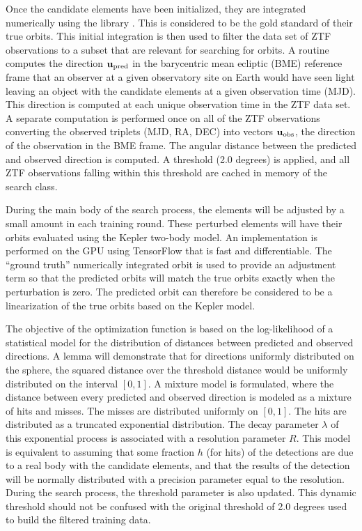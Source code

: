 Once the candidate elements have been initialized, they are integrated numerically using the  library \cite{RL-Rebound}.
This is considered to be the gold standard of their true orbits.
This initial integration is then used to filter the data set of ZTF observations to a subset that are relevant for searching for orbits.
A routine computes the direction $\mathbf{u}_{\mathrm{pred}}$ in the barycentric mean ecliptic (BME) reference frame
that an observer at a given observatory site on Earth would have seen light leaving an object with the candidate elements at a given observation time (MJD).
This direction is computed at each unique observation time in the ZTF data set.
A separate computation is performed once on all of the ZTF observations converting the observed triplets (MJD, RA, DEC)
into vectors $\mathbf{u}_{\mathrm{obs}}$, the direction of the observation in the BME frame.
The angular distance between the predicted and observed direction is computed.
A threshold (2.0 degrees) is applied, and all ZTF observations falling within this threshold are cached in memory of the search class.

During the main body of the search process, the elements will be adjusted by a small amount in each training round.
These perturbed elements will have their orbits evaluated using the Kepler two-body model.
An implementation is performed on the GPU using TensorFlow that is fast and differentiable.
The ``ground truth'' numerically integrated orbit is used to provide an adjustment term 
so that the predicted orbits will match the true orbits exactly when the perturbation is zero.
The predicted orbit can therefore be considered to be a linearization of the true orbits based on the Kepler model.

The objective of the optimization function is based on the log-likelihood of a statistical model for the 
distribution of distances between predicted and observed directions.
A lemma will demonstrate that for directions uniformly distributed on the sphere, the squared distance over the 
threshold distance would be uniformly distributed on the interval $[0, 1]$.
A mixture model is formulated, where the distance between every predicted and observed direction is modeled as a mixture of hits and misses.
The misses are distributed uniformly on $[0, 1]$.
The hits are distributed as a truncated exponential distribution.
The decay parameter $\lambda$ of this exponential process is associated with a resolution parameter $R$.
This model is equivalent to assuming that some fraction $h$ (for hits) of the detections are due to 
a real body with the candidate elements, and that the results of the detection will be normally distributed 
with a precision parameter equal to the resolution.
During the search process, the threshold parameter is also updated.
This dynamic threshold should not be confused with the original threshold of 2.0 degrees used to build the filtered training data.

